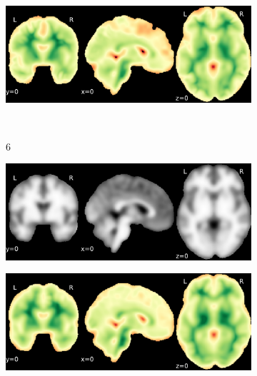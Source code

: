 \documentclass{article}
\begin{document}
\begin{appendices}
\begin{landscape}
\begin{figure}
\begin{subfigure}[t]{0.2\paperheight}
            \end{subfigure}
            \begin{subfigure}[t]{0.2\paperheight}
                \centering
                \includegraphics[width=\textwidth]{figures/sig/10mm/rr.rs_ds001748_sub-adult15_sig.pdf}
            \end{subfigure} \\
            \begin{subfigure}[b][][c]{0.01\paperwidth} 6 \vspace*{15pt} \end{subfigure}
            \begin{subfigure}[t]{0.2\paperheight}
                \centering
                \includegraphics[width=\textwidth]{figures/sig/10mm/ieee_ds001748_sub-adult16.pdf}
            \end{subfigure}
            \begin{subfigure}[t]{0.2\paperheight}
                \centering
                \includegraphics[width=\textwidth]{figures/sig/10mm/rr_ds001748_sub-adult16_sig.pdf}

\end{subfigure}
\end{figure}
\end{landscape}
\end{appendices}
\end{document}
